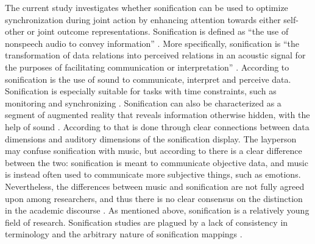 \documentclass[10pt,a4paper,onecolumn]{article}
\begin{document}
The current study investigates whether sonification can be used to optimize synchronization during joint action by enhancing attention towards either self-other or joint outcome representations. Sonification is defined as ``the use of nonspeech audio to convey information'' \autocite[p.~4]{kramerSonificationReportStatus1999}. More specifically, sonification is ``the transformation of data relations into perceived relations in an acoustic signal for the purposes of facilitating communication or interpretation'' \autocite[p.~4]{kramerSonificationReportStatus1999}. According to \textcite{dubusInteractiveSonificationMotion2013} sonification is the use of sound to communicate, interpret and perceive data. Sonification is especially suitable for tasks with time constraints, such as monitoring and synchronizing \autocite{dubusInteractiveSonificationMotion2013}. Sonification can also be characterized as a segment of augmented reality that reveals information otherwise hidden, with the help of sound \autocite{dubusInteractiveSonificationMotion2013}. According to \textcite{dubusInteractiveSonificationMotion2013} that is done through clear connections between data dimensions and auditory dimensions of the sonification display. The layperson may confuse sonification with music, but according to \textcite{dubusInteractiveSonificationMotion2013} there is a clear difference between the two: sonification is meant to communicate objective data, and music is instead often used to communicate more subjective things, such as emotions. Nevertheless, the differences between music and sonification are not fully agreed upon among researchers, and thus there is no clear consensus on the distinction in the academic discourse \autocite{dubusInteractiveSonificationMotion2013}. As mentioned above, sonification is a relatively young field of research. Sonification studies are plagued by a lack of consistency in terminology and the arbitrary nature of sonification mappings \autocite{dubusInteractiveSonificationMotion2013,dubusSystematicReviewMapping2013}.
\end{document}
